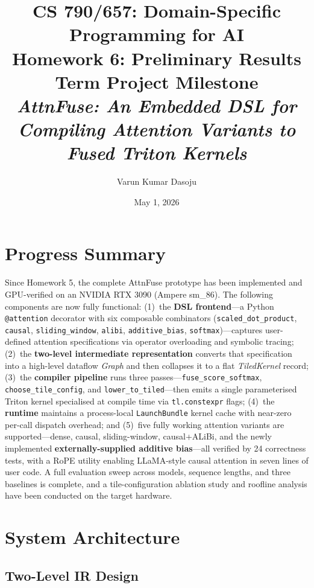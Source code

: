 \documentclass[12pt]{article}
\title{%
  \large\textbf{CS 790/657: Domain-Specific Programming for AI}\\[4pt]
  \Large\textbf{Homework 6: Preliminary Results}\\[2pt]
  \large Term Project Milestone\\[8pt]
  \normalsize\textit{AttnFuse: An Embedded DSL for Compiling
    Attention Variants to Fused Triton Kernels}
}
\author{Varun Kumar Dasoju}
\date{May 1, 2026}
\begin{document}
\maketitle
\tableofcontents
\newpage

\section{Progress Summary}

Since Homework 5, the complete AttnFuse prototype has been implemented and
GPU-verified on an NVIDIA RTX 3090 (Ampere sm\_86).  The following components
are now fully functional: (1)~the \textbf{DSL frontend}—a Python
\texttt{@attention} decorator with six composable combinators
(\texttt{scaled\_dot\_product}, \texttt{causal}, \texttt{sliding\_window},
\texttt{alibi}, \texttt{additive\_bias}, \texttt{softmax})—captures
user-defined attention specifications via operator overloading and symbolic
tracing; (2)~the \textbf{two-level intermediate representation} converts
that specification into a high-level dataflow \textit{Graph} and then
collapses it to a flat \textit{TiledKernel} record; (3)~the
\textbf{compiler pipeline} runs three passes—\texttt{fuse\_score\_softmax},
\texttt{choose\_tile\_config}, and \texttt{lower\_to\_tiled}—then emits a
single parameterised Triton kernel specialised at compile time via
\texttt{tl.constexpr} flags; (4)~the \textbf{runtime} maintains a
process-local \texttt{LaunchBundle} kernel cache with near-zero per-call
dispatch overhead; and (5)~five fully working attention variants are
supported—dense, causal, sliding-window, causal+ALiBi, and the newly
implemented \textbf{externally-supplied additive bias}—all verified by 24
correctness tests, with a RoPE utility enabling LLaMA-style causal attention
in seven lines of user code.  A full evaluation sweep across models, sequence
lengths, and three baselines is complete, and a tile-configuration ablation
study and roofline analysis have been conducted on the target hardware.

\section{System Architecture}

\subsection{Two-Level IR Design}
\end{document}
